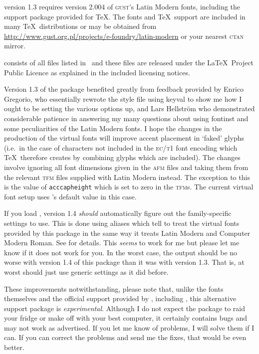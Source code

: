 \documentclass[11pt,british,a4paper]{article}
\begin{document}
 version 1.3 requires version 2.004 of \textsc{gust}'s Latin Modern fonts, including the support package provided for \TeX. The fonts and \TeX\ support are included in many \TeX\ distributions or may be obtained from \url{http://www.gust.org.pl/projects/e-foundry/latin-modern} or your nearest \textsc{ctan} mirror.

 consists of all files listed in \ and these files are released under the \LaTeX\ Project Public Licence as explained in the included licensing notices.

Version 1.3 of the package benefited greatly from feedback provided by Enrico Gregorio, who essentially rewrote the style file using keyval to show me how I ought to be setting the various options up, and Lars Hellström who demonstrated considerable patience in answering my many questions about using fontinst and some peculiarities of the Latin Modern fonts. I hope the changes in the production of the virtual fonts will improve accent placement in ‘faked’ glyphs (i.e.\ in the case of characters not included in the \textsc{ec}/\textsc{t1} font encoding which \TeX\ therefore creates by combining glyphs which are included). The changes involve ignoring all font dimensions given in the \textsc{afm} files and taking them from the relevant \textsc{tfm} files supplied with Latin Modern instead. The exception to this is the value of \verb|acccapheight| which is set to zero in the \textsc{tfm}s. The current virtual font setup uses 's default value in this case.

If you load , version 1.4 \emph{should} automatically figure out the family-specific settings to use. This is done using aliases which tell  to treat the virtual fonts provided by this package in the same way it treats Latin Modern and Computer Modern Roman. See  for details. This \emph{seems} to work for me but please let me know if it does not work for you. In the worst case, the output should be no worse with version 1.4 of this package than it was with version 1.3. That is, at worst  should just use generic settings as it did before.

These improvements notwithstanding, please note that, unlike the fonts themselves and the official support provided by , including , this alternative support package is \emph{experimental}. Although I do not expect the package to raid your fridge or make off with your best computer, it certainly contains bugs and may not work as advertised. If you let me know of problems, I will solve them if I can. If you can correct the problems and send me the fixes, that would be even better.
\end{document}
